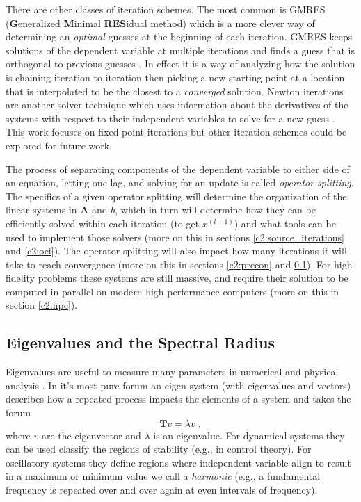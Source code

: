 There are other classes of iteration schemes. 
The most common is GMRES (\textbf{G}eneralized \textbf{M}inimal \textbf{RES}idual method) which is a more clever way of determining an \emph{optimal} guesses at the beginning of each iteration.
GMRES keeps solutions of the dependent variable at multiple iterations and finds a guess that is orthogonal to previous guesses \cite{kylov2004warsa, subspace2004warsa, gmres1996kelley, patton_gmres_2002}.
In effect it is a way of analyzing how the solution is chaining iteration-to-iteration then picking a new starting point at a location that is interpolated to be the closest to a \emph{converged} solution.
Newton iterations are another solver technique which uses information about the derivatives of the systems with respect to their independent variables to solve for a new guess \cite{ctkelle_newton}.
This work focuses on fixed point iterations but other iteration schemes could be explored for future work.

The process of separating components of the dependent variable to either side of an equation, letting one lag, and solving for an update is called \emph{operator splitting}.
The specifics of a given operator splitting will determine the organization of the linear systems in $\bm{A}$ and $b$, which in turn will determine how they can be efficiently solved within each iteration (to get $x^{(l+1)}$) and what tools can be used to implement those solvers (more on this in sections \ref{c2:source_iterations} and \ref{c2:oci}).
The operator splitting will also impact how many iterations it will take to reach convergence (more on this in sections \ref{c2:precon} and \ref{c2:specrad}).
For high fidelity problems these systems are still massive, and require their solution to be computed in parallel on modern high performance computers (more on this in section \ref{c2:hpc}).


\subsection{Eigenvalues and the Spectral Radius}
\label{c2:specrad}

Eigenvalues are useful to measure many parameters in numerical and physical analysis \cite{maggie_phd}.
In it's most pure forum an eigen-system (with eigenvalues and vectors) describes how a repeated process impacts the elements of a system and takes the forum
\begin{equation}
    \bm{T}v = \lambda v \;,
\end{equation}
where $v$ are the eigenvector and $\lambda$ is an eigenvalue.
For dynamical systems they can be used classify the regions of stability (e.g., in control theory).
For oscillatory systems they define regions where independent variable align to result in a maximum or minimum value we call a \emph{harmonic} (e.g., a fundamental frequency is repeated over and over again at even intervals of frequency).


